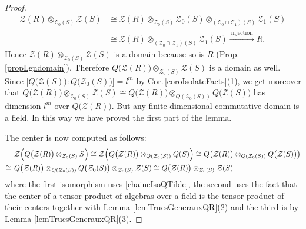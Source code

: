 \documentclass[11pt]{amsart}
\begin{document}
\begin{proof}
\begin{align*}
\mathcal{Z}(R) \otimes_{\mathcal{Z}_0(S)} \mathcal{Z}(S) &\cong \mathcal{Z}(R) \otimes_{\mathcal{Z}_0(S)} \mathcal{Z}_0(S) \otimes_{(\mathcal{Z}_0 \cap \mathcal{Z}_1)(S)} \mathcal{Z}_1(S)\\
& \cong \mathcal{Z}(R) \otimes_{(\mathcal{Z}_0 \cap \mathcal{Z}_1)(S)} \mathcal{Z}_1(S) \xrightarrow{\:\text{injection}\:} R.
\end{align*}
Hence $\mathcal{Z}(R) \otimes_{\mathcal{Z}_0(S)} \mathcal{Z}(S)$ is a domain because so is $R$ (Prop.\,\ref{propLgndomain}). Therefore $Q\bigl( \mathcal{Z}(R) \bigr) \otimes_{\mathcal{Z}_0(S)} \mathcal{Z}(S)$ is a domain as well. Since $\bigl[ Q\bigl(\mathcal{Z}(S)\bigr) : Q\bigl(\mathcal{Z}_0(S)\bigr) \bigr] = l^m$ by Cor.\,\ref{coroIsolateFacts}(1), we get moreover that $Q\bigl( \mathcal{Z}(R) \bigr) \otimes_{\mathcal{Z}_0(S)} \mathcal{Z}(S) \cong Q\bigl( \mathcal{Z}(R) \bigr) \otimes_{Q(\mathcal{Z}_0(S))} Q\bigl( \mathcal{Z}(S) \bigr)$ has dimension $l^m$ over $Q\bigl( \mathcal{Z}(R) \bigr)$. But any finite-dimensional commutative domain is a field. In this way we have proved the first part of the lemma. 

The center is now computed as follows:
\begin{align*}
&\mathcal{Z}\Bigl( Q\bigl( \mathcal{Z}(R) \bigr) \otimes_{\mathcal{Z}_0(S)} S \Bigr) \cong \mathcal{Z}\Bigl( Q\bigl( \mathcal{Z}(R) \bigr) \otimes_{Q(\mathcal{Z}_0(S))} Q(S) \Bigr) \cong Q\bigl( \mathcal{Z}(R) \bigr) \otimes_{Q(\mathcal{Z}_0(S))} Q\bigl( \mathcal{Z}(S) \bigr) \bigr)\\
\cong\:\,& Q\bigl( \mathcal{Z}(R) \bigr) \otimes_{Q(\mathcal{Z}_0(S))} Q\bigl( \mathcal{Z}_0(S)  \bigr) \otimes_{\mathcal{Z}_0(S)} \mathcal{Z}(S)\cong Q\bigl( \mathcal{Z}(R) \bigr) \otimes_{\mathcal{Z}_0(S)} \mathcal{Z}(S)
\end{align*}
where the first isomorphism uses \eqref{chaineIsoQTilde}, the second uses the fact that the center of a tensor product of algebras over a field is the tensor product of their centers \cite[Cor.\,1.7.24]{Rowen} together with Lemma \ref{lemTrucsGenerauxQR}(2) and the third is by Lemma \ref{lemTrucsGenerauxQR}(3).
\end{proof}
\end{document}

